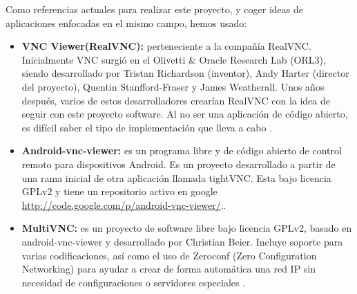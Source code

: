 Como referencias actuales para realizar este proyecto, y coger ideas de aplicaciones enfocadas en el mismo campo, hemos usado:
\begin{itemize}
\item \textbf{VNC Viewer(RealVNC):} perteneciente a la compañía RealVNC. Inicialmente VNC surgió en el Olivetti \& Oracle Research Lab (ORL3), siendo desarrollado por Tristan Richardson (inventor), Andy Harter (director del proyecto), Quentin Stanfford-Fraser y James Weatherall. Unos años después, varios de estos desarrolladores crearían RealVNC con la idea de seguir con este proyecto software. Al no ser una aplicación de código abierto, es difícil saber el tipo de implementación que lleva a cabo \cite{wiki:realvnc}.
\item \textbf{Android-vnc-viewer:} es un programa libre y de código abierto de control remoto para dispositivos Android. Es un proyecto desarrollado a partir de una rama inicial de otra aplicación llamada tightVNC. Esta bajo licencia GPLv2 y tiene un repositorio activo en google \url{http://code.google.com/p/android-vnc-viewer/}.\cite{androidvnc:androidvnc}.
\item \textbf{MultiVNC:} es un proyecto de software libre bajo licencia GPLv2,  basado en android-vnc-viewer y desarrollado por Christian Beier. Incluye soporte para varias codificaciones, así como el uso de Zeroconf (Zero Configuration Networking) para ayudar a crear de forma automática una red IP sin necesidad de configuraciones o servidores especiales \cite{multivnc:multivnc}.
\end{itemize}
